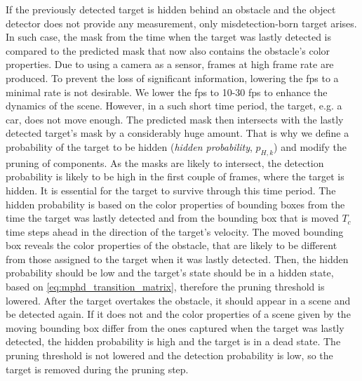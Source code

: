 If the previously detected target is hidden behind an obstacle and the object detector does not provide any
measurement, only misdetection-born target arises. In such case, the mask from the time when the target was lastly
detected is compared to the predicted mask that now also contains the obstacle's color properties. Due to using
a camera as
a sensor, frames at high frame rate are produced. To prevent the loss of significant information, lowering the fps to a minimal rate is not desirable. We lower the fps to 10-30 fps to enhance the dynamics of the scene. However, in a such short time
period, the target, e.g. a car, does not move enough. The predicted mask then intersects with the lastly
detected target's mask by a considerably huge amount. That is why we define a probability of the target to be hidden (\textit{hidden probability}, $p_{H,k}$) and modify
the pruning of components. As the masks are likely to intersect, the detection probability is likely to be high in
the first couple of frames, where the target is hidden. It is essential for the target to survive through this time
period. The hidden probability is based on the color properties of bounding boxes from the time the target was lastly
detected
and from the bounding box that is moved $T_c$ time steps ahead in the direction of the target's velocity. The moved
bounding box reveals the color properties of the obstacle, that are likely to be different from those assigned to the
target
when it was lastly detected. Then, the hidden probability should be low and the target's state should be in a hidden
state,
based on \eqref{eq:mphd_transition_matrix}, therefore the pruning threshold is lowered. After the target overtakes the
obstacle,
it should appear in a scene and be detected again. If it does not and the color properties of a scene given by the
moving
bounding box differ from the ones captured when the target was lastly detected, the hidden probability is high and the
target is
in a dead state. The pruning threshold is not lowered and the detection probability is low, so the target is removed
during the pruning step.
